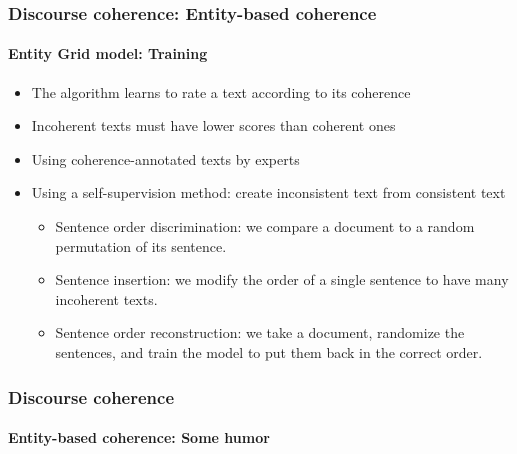 \documentclass[xcolor=table]{beamer}
\begin{document}
\begin{frame}
	\frametitle{Discourse coherence: Entity-based coherence}
	\framesubtitle{Entity Grid model: Training}

	\begin{itemize}
		\item The algorithm learns to rate a text according to its coherence
		\item Incoherent texts must have lower scores than coherent ones
		\item Using coherence-annotated texts by experts
		\item Using a self-supervision method: create inconsistent text from consistent text
		\begin{itemize}
			\item Sentence order discrimination: we compare a document to a random permutation of its sentence. 
			\item Sentence insertion: we modify the order of a single sentence to have many incoherent texts.
			\item Sentence order reconstruction: we take a document, randomize the sentences, and train the model to put them back in the correct order. 
		\end{itemize}
	\end{itemize}
	
\end{frame}

\begin{frame}
	\frametitle{Discourse coherence}
	\framesubtitle{Entity-based coherence: Some humor}
	
	\begin{center}
	\end{center}
	
\end{frame}


\end{document}
